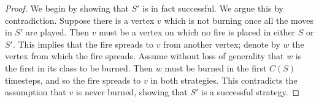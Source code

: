 \documentclass[10pt,a4paper]{amsart}
\begin{document}
\begin{proof}
    We begin by showing that $S'$ is in fact successful. We argue this by contradiction. Suppose there is a vertex $v$ which is not burning once all the moves in $S'$ are played. Then $v$ must be a vertex on which no fire is placed in either $S$ or $S'$. This implies that the fire spreads to $v$ from another vertex; denote by $w$ the vertex from which the fire spreads. Assume without loss of generality that $w$ is the first in its class to be burned. Then $w$ must be burned in the first $C(S)$ timesteps, and so the fire spreads to $v$ in both strategies. This contradicts the assumption that $v$ is never burned, showing that $S'$ is a successful strategy.





\end{proof}
\end{document}
